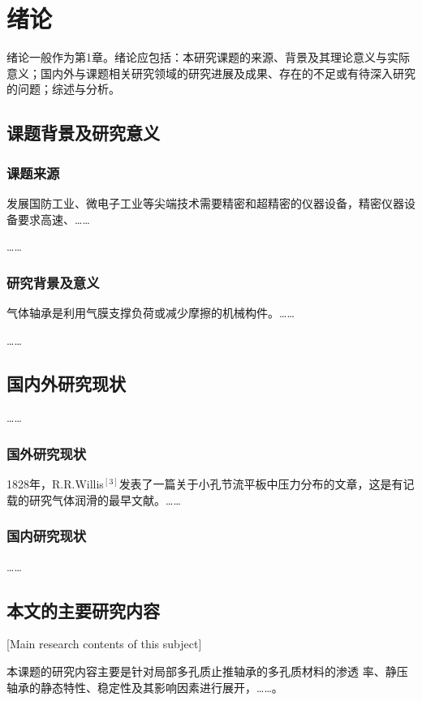 
\chapter{绪论}

绪论一般作为第1章。绪论应包括：本研究课题的来源、背景及其理论意义与实际意义；国内外与课题相关研究领域的研究进展及成果、存在的不足或有待深入研究的问题；综述与分析。

\section{课题背景及研究意义}

\subsection{课题来源}

发展国防工业、微电子工业等尖端技术需要精密和超精密的仪器设备，精密仪器设备要求高速、\dots\dots

\dots\dots

\subsection{研究背景及意义}

气体轴承是利用气膜支撑负荷或减少摩擦的机械构件。\dots\dots

\dots\dots

\section{国内外研究现状}

\dots\dots

\subsection{国外研究现状}

1828年，R.R.Willis$^{[3]}$发表了一篇关于小孔节流平板中压力分布的文章，这是有记载的研究气体润滑的最早文献。\dots\dots

\subsection{国内研究现状}

\ldots\ldots

\section{本文的主要研究内容}[Main research contents of this subject]

本课题的研究内容主要是针对局部多孔质止推轴承的多孔质材料的渗透
率、静压轴承的静态特性、稳定性及其影响因素进行展开，\dots\dots。
